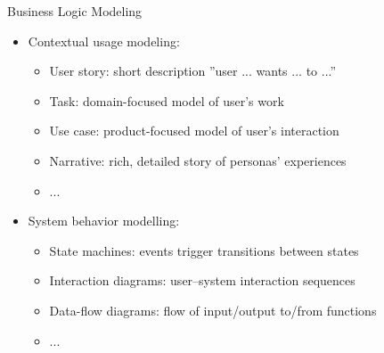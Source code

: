 \begin{Slide}{Business Logic Modeling}
\begin{itemize}
\item Contextual usage modeling:
\begin{itemize}
\item User story: short description ''user ... wants ... to ...''
\item Task: domain-focused model of user's work
\item Use case: product-focused model of user's interaction
\item Narrative: rich, detailed story of personas' experiences
\item ...
\end{itemize}
\item System behavior modelling:
\begin{itemize}
\item State machines: events trigger transitions between states
\item Interaction diagrams: user--system interaction sequences
\item Data-flow diagrams: flow of input/output to/from functions
\item  ...

\end{itemize}
\end{itemize}
\end{Slide}